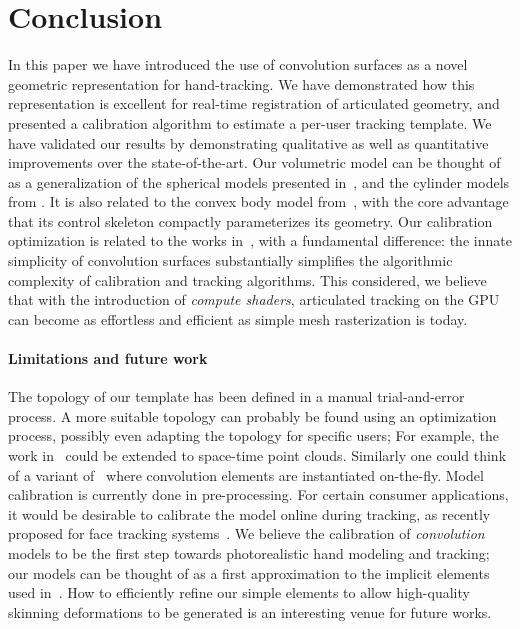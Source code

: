 
\section{Conclusion}
\label{sec:conclusion}

In this paper we have introduced the use of convolution surfaces as a novel geometric representation for hand-tracking. We have demonstrated how this representation is excellent for real-time registration of articulated geometry, and presented a calibration algorithm to estimate a per-user tracking template. We have validated our results by demonstrating qualitative as well as quantitative improvements over the state-of-the-art. Our volumetric model can be thought of as a generalization of the spherical models presented in~\cite{sridhar2015fast,qian2014realtime}, and the cylinder models from \cite{oiko2011hand,tagliasacchi2015robust}. It is also related to the convex body model from~\cite{melax2013dynamics}, with the core advantage that its control skeleton compactly parameterizes its geometry. Our calibration optimization is related to the works in~\cite{taylor2014user,khamis15learning,tan2016fitsglove}, with a fundamental difference: the innate simplicity of convolution surfaces substantially simplifies the algorithmic complexity of calibration and tracking algorithms. This considered, we believe that with the introduction of \emph{compute shaders}, articulated tracking on the GPU can become as effortless and efficient as simple mesh rasterization is today.

\paragraph{Limitations and future work} 
The topology of our template has been defined in a manual trial-and-error process. A more suitable topology can probably be found using an optimization process, possibly even adapting the topology for specific users; For example, the work in~\cite{thiery2016spheremesh} could be extended to space-time point clouds. Similarly one could think of a variant of~\cite{newcombe2015dynfusion} where convolution elements are instantiated on-the-fly.
Model calibration is currently done in pre-processing. For certain consumer applications, it would be desirable to calibrate the model online during tracking, as recently proposed for face tracking systems~\cite{bouaziz2013online}. 
% 
We believe the calibration of \emph{convolution} models to be the first step towards photorealistic hand modeling and tracking; our models can be thought of as a first approximation to the implicit elements used in~\cite{vaillant2013implicit}. How to efficiently refine our simple elements to allow high-quality skinning deformations to be generated is an interesting venue for future works.

